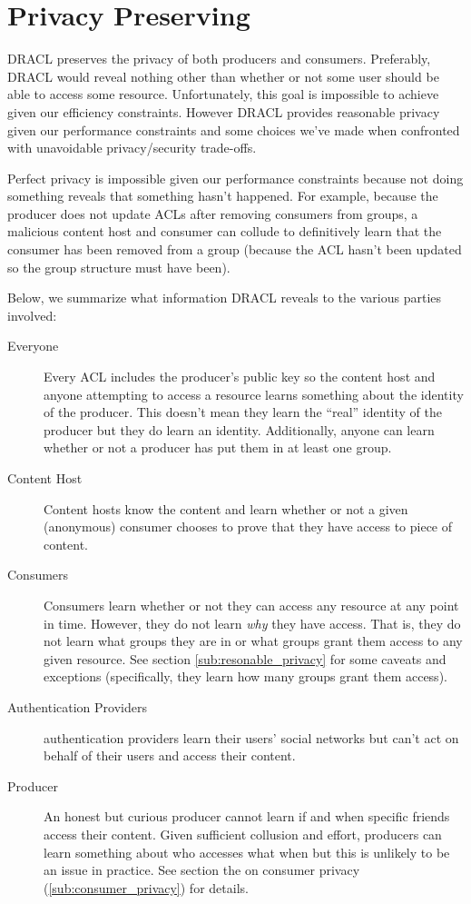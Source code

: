 \documentclass[pdftex,12pt,a4papaer,twoside,notitlepage]{report}
\begin{document}
\section{Privacy Preserving}
\label{sec:privacy}

DRACL preserves the privacy of both producers and consumers. Preferably, DRACL
would reveal nothing other than whether or not some user should be able to
access some resource. Unfortunately, this goal is impossible to achieve given
our efficiency constraints. However DRACL provides reasonable privacy given our
performance constraints and some choices we've made when confronted with
unavoidable privacy/security trade-offs.

Perfect privacy is impossible given our performance constraints because not
doing something reveals that something hasn't happened. For example, because the
producer does not update ACLs after removing consumers from groups, a malicious
content host and consumer can collude to definitively learn that the consumer
has been removed from a group (because the ACL hasn't been updated so the group
structure must have been).

Below, we summarize what information DRACL reveals to the various parties involved:

\begin{description}
\item[Everyone] Every ACL includes the producer's public key so the content host
  and anyone attempting to access a resource learns something about the identity
  of the producer. This doesn't mean they learn the ``real'' identity of the
  producer but they do learn an identity. Additionally, anyone can learn whether
  or not a producer has put them in at least one group.
\item[Content Host] Content hosts know the content and learn whether or not a
  given (anonymous) consumer chooses to prove that they have access to piece of
  content.
\item[Consumers] Consumers learn whether or not they can access any resource at
  any point in time. However, they do not learn \emph{why} they have access.
  That is, they do not learn what groups they are in or what groups grant them
  access to any given resource. See section \ref{sub:resonable_privacy} for
  some caveats and exceptions (specifically, they learn how many groups grant
  them access).
\item[Authentication Providers] authentication providers learn their users'
  social networks but can't act on behalf of their users and access their
  content.
\item[Producer] An honest but curious producer cannot learn if and when specific
  friends access their content. Given sufficient collusion and effort, producers
  can learn something about who accesses what when but this is unlikely to be an
  issue in practice. See section the on consumer privacy
  (\ref{sub:consumer_privacy}) for details.
\end{description}
\end{document}
